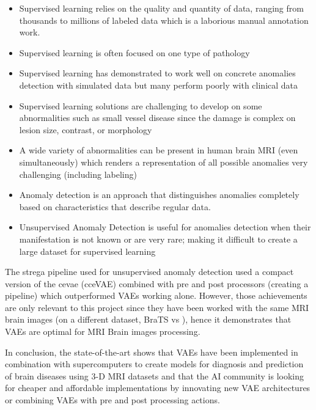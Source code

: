 \begin{itemize}
    \item Supervised learning relies on the quality and quantity of data, ranging from thousands to millions of labeled data which is a laborious manual annotation work.
    \item Supervised learning is often focused on one type of pathology
    \item Supervised learning has demonstrated to work well on concrete anomalies detection with simulated data but many perform poorly with clinical data
    \item Supervised learning solutions are challenging to develop on some abnormalities such as small vessel disease since the damage is complex on lesion size, contrast, or morphology
    \item A wide variety of abnormalities can be present in human brain MRI (even simultaneously) which renders a representation of all possible anomalies very challenging (including labeling)
    \item Anomaly detection is an approach that distinguishes anomalies completely based on characteristics that describe regular data.
    \item Unsupervised Anomaly Detection is useful for anomalies detection when their manifestation is not known or are very rare; making it difficult to create a large dataset for supervised learning
\end{itemize}

The \Acrshort{strega} pipeline used for unsupervised anomaly detection used a compact version of the \acrshort{cevae} (cceVAE) combined with pre and post processors (creating a pipeline) which outperformed VAEs working alone. However, those achievements are only relevant to this project since they have been worked with the same MRI brain images (on a different dataset, BraTS \cite{brats} vs ), hence it demonstrates that VAEs are optimal for MRI Brain images processing.

In conclusion, the state-of-the-art shows that VAEs have been implemented in combination with supercomputers to create models for diagnosis and prediction of brain diseases using 3-D MRI datasets and that the AI community is looking for cheaper and affordable implementations by innovating new VAE architectures or combining VAEs with pre and post processing actions.